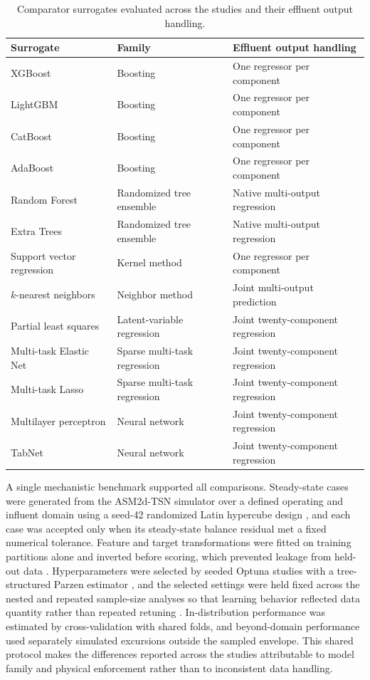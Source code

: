 \documentclass[12pt, twoside]{book}
\begin{document}
\begin{table}[htbp]
\centering
\caption{Comparator surrogates evaluated across the studies and their effluent output handling.}
\label{tab:appB_models}
\small
\setlength{\tabcolsep}{6pt}
\begin{tabular}{l l p{5.4cm}}
\toprule
Surrogate & Family & Effluent output handling \\
\midrule
XGBoost & Boosting & One regressor per component \\
LightGBM & Boosting & One regressor per component \\
CatBoost & Boosting & One regressor per component \\
AdaBoost & Boosting & One regressor per component \\
Random Forest & Randomized tree ensemble & Native multi-output regression \\
Extra Trees & Randomized tree ensemble & Native multi-output regression \\
Support vector regression & Kernel method & One regressor per component \\
$k$-nearest neighbors & Neighbor method & Joint multi-output prediction \\
Partial least squares & Latent-variable regression & Joint twenty-component regression \\
Multi-task Elastic Net & Sparse multi-task regression & Joint twenty-component regression \\
Multi-task Lasso & Sparse multi-task regression & Joint twenty-component regression \\
Multilayer perceptron & Neural network & Joint twenty-component regression \\
TabNet & Neural network & Joint twenty-component regression \\
\bottomrule
\end{tabular}
\end{table}

A single mechanistic benchmark supported all comparisons. Steady-state cases were generated from the ASM2d-TSN
simulator over a defined operating and influent domain using a seed-42 randomized Latin hypercube design
\citep{McKay1979}, and each case was accepted only when its steady-state balance residual met a fixed numerical
tolerance. Feature and target transformations were fitted on training partitions alone and inverted before
scoring, which prevented leakage from held-out data \citep{Pinheiro2025}. Hyperparameters were selected by
seeded Optuna studies with a tree-structured Parzen estimator \citep{Akiba2019}, and the selected settings were
held fixed across the nested and repeated sample-size analyses so that learning behavior reflected data quantity
rather than repeated retuning \citep{VieringLoog2023}. In-distribution performance was estimated by
cross-validation with shared folds, and beyond-domain performance used separately simulated excursions outside
the sampled envelope. This shared protocol makes the differences reported across the studies attributable to
model family and physical enforcement rather than to inconsistent data handling.
\end{document}

